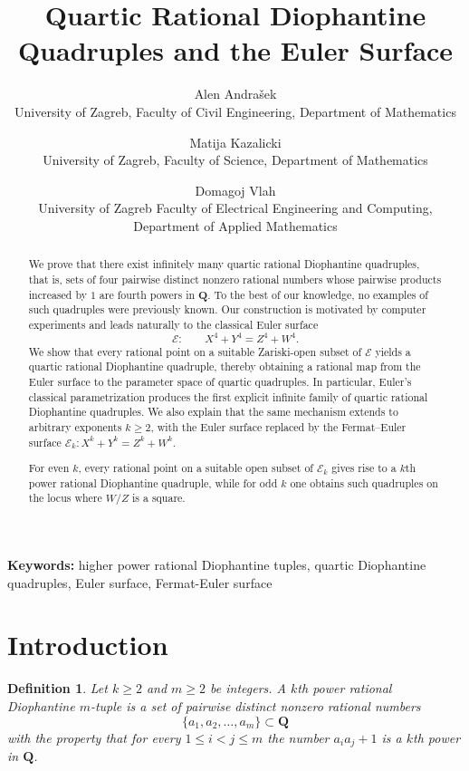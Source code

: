 \documentclass[11pt]{article}
\title{Quartic Rational Diophantine Quadruples and the Euler Surface}
\author{%
Alen Andra\v{s}ek\\
{\small University of Zagreb, Faculty of Civil Engineering, Department of Mathematics}
\and
Matija Kazalicki\\
{\small University of Zagreb, Faculty of Science, Department of Mathematics}
\and
Domagoj Vlah\\
{\small University of Zagreb Faculty of Electrical Engineering and Computing, Department of Applied Mathematics}%
}
\date{}
\newtheorem{definition}[theorem]{Definition}
\newcommand{\Q}{\mathbf{Q}}
\newcommand{\Eul}{\mathcal{E}}
\newcommand{\keywords}[1]{\par\medskip\noindent\textbf{Keywords: }#1}
\begin{document}
\maketitle


\begin{abstract}
We prove that there exist infinitely many quartic rational Diophantine quadruples, that is, sets of four pairwise distinct nonzero rational numbers whose pairwise products increased by \(1\) are fourth powers in \(\Q\). To the best of our knowledge, no examples of such quadruples were previously known. Our construction is motivated by computer experiments and leads naturally to the classical Euler surface
\[
\Eul:\qquad X^4+Y^4=Z^4+W^4.
\]
We show that every rational point on a suitable Zariski-open subset of \(\Eul\) yields a quartic rational Diophantine quadruple, thereby obtaining a rational map from the Euler surface to the parameter space of quartic quadruples. In particular, Euler's classical parametrization produces the first explicit infinite family of quartic rational Diophantine quadruples. We also explain that the same mechanism extends to arbitrary exponents \(k\geq 2\), with the Euler surface replaced by the Fermat--Euler surface \(\mathcal E_k:X^k+Y^k=Z^k+W^k\).

For even \(k\), every rational point on a suitable open subset of \(\mathcal E_k\) gives rise to a \(k\)th power rational Diophantine quadruple, while for odd \(k\) one obtains such quadruples on the locus where \(W/Z\) is a square.
\end{abstract}
\keywords{higher power rational Diophantine tuples, quartic Diophantine quadruples, Euler surface, Fermat-Euler surface}
\section{Introduction}

\begin{definition}
Let $k\geq 2$ and $m\geq 2$ be integers. A \emph{$k$th power rational Diophantine $m$-tuple} is a set of pairwise distinct nonzero rational numbers
\[
\{a_1,a_2,\dots,a_m\}\subset \Q
\]
with the property that for every $1\leq i<j\leq m$ the number $a_i a_j+1$ is a $k$th power in $\Q$.
\end{definition}
\end{document}
